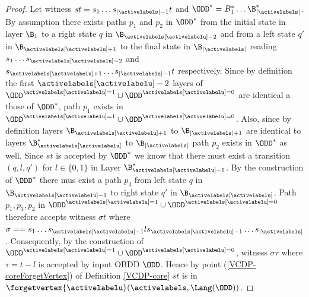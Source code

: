 \begin{proof}
    Let witness $st = s_1\dots s_{|\activelabels|-1}t$ and $\ODD^* = B_1^*\dots \B_{|\activelabels|}^*$. 
    By assumption there exists paths $p_1$ and $p_2$ in $\ODD^*$ from the initial state in layer $\B_1$ to a right state $q$ in $\B_{\activelabels[\activelabelu]-2}$ and from a left state $q'$ in $\B_{\activelabels[\activelabelu]+1}$ to the final state in $\B_{|\activelabels|}$ reading $s_1\dots s_{\activelabels[\activelabelu]-2}$ and $ s_{\activelabels[\activelabelu]+1}\dots s_{|\activelabels|-1}t$ respectively. Since by definition the first $\activelabels[\activelabelu]-2$ layers of $\ODD^{\activelabels[\activelabelu]=1}\cup\ODD^{\activelabels[\activelabelu]=0}$ are identical a those of $\ODD^*$, path $p_1$ exists in $\ODD^{\activelabels[\activelabelu]=1}\cup\ODD^{\activelabels[\activelabelu]=0}$. Also, since by definition layers $\B_{\activelabels[\activelabelu]+1}$ to $\B_{|\activelabels|+1}$ are identical to layers $\B_{\activelabels[\activelabelu]}^*$ to $\B_{|\activelabels|}$ path $p_2$ exists in $\ODD^*$ as well. Since $st$ is accepted by $\ODD^*$ we know that there must exist a transition $(q, l, q')$ for $l\in \{0,1\}$ in Layer $\B_{\activelabels[\activelabelu]-1}^*$. By the construction of $\ODD^*$ there mus exist a path $p_3$ from left state $q$ in $\B_{\activelabels[\activelabelu]-1}$ to right state $q'$ in $\B_{\activelabels[\activelabelu]}$. Path $p_1, p_3, p_2$ in $\ODD^{\activelabels[\activelabelu]=1}\cup\ODD^{\activelabels[\activelabelu]=0}$ therefore accepts witness $\sigma t $ where $\sigma = = s_1\dots s_{\activelabels[\activelabelu]-1}l s_{\activelabels[\activelabelu]-1}\dots s_{|\activelabels|}$. Consequently, by the construction of $\ODD^{\activelabels[\activelabelu]=1}\cup\ODD^{\activelabels[\activelabelu]=0}$, witness $\sigma\tau$ where $\tau = t-l$ is accepted by input OBDD $\ODD$. Hence by point (\ref{VCDP-coreForgetVertex}) of Definition \ref{VCDP-core} $st$ is in $\forgetvertex{\activelabelu}(\activelabels,\Lang(\ODD))$.

\end{proof}
